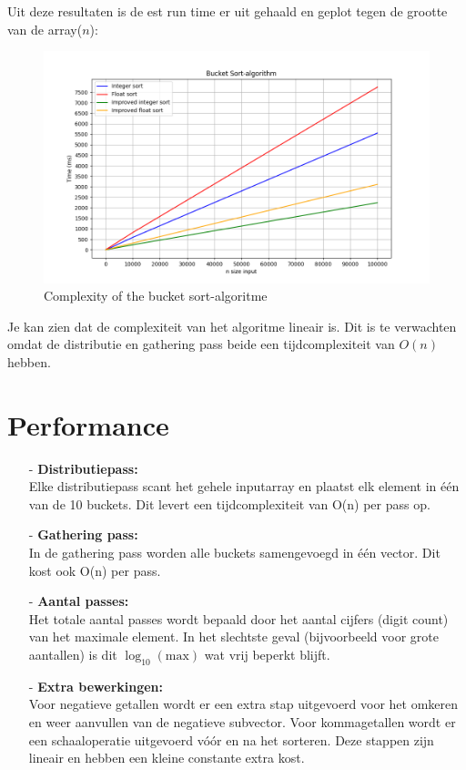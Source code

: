 \documentclass{article}
\begin{document}
\newpage
Uit deze resultaten is de est run time er uit gehaald en geplot tegen de grootte van de array($n$):

\begin{figure}[H]
    \includegraphics[width=1\textwidth]{images/bucket_sort.png}
    \caption{Complexity of the bucket sort-algoritme}
    \label{fig:complexity}
\end{figure}
Je kan zien dat de complexiteit van het algoritme lineair is. Dit is te verwachten omdat de distributie en gathering pass beide een tijdcomplexiteit van \(O(n)\) hebben.

\section{Performance}
\begin{itemize}
\item[-] \textbf{Distributiepass:} \\
Elke distributiepass scant het gehele inputarray en plaatst elk element in één van de 10 buckets. Dit levert een tijdcomplexiteit van O(n) per pass op.

\item[-] \textbf{Gathering pass:} \\
In de gathering pass worden alle buckets samengevoegd in één vector. Dit kost ook O(n) per pass.

\item[-] \textbf{Aantal passes:} \\
Het totale aantal passes wordt bepaald door het aantal cijfers (digit count) van het maximale element. In het slechtste geval (bijvoorbeeld voor grote aantallen) is dit $\log_{10}(\mathrm{max})$ wat vrij beperkt blijft.

\item[-] \textbf{Extra bewerkingen:} \\
Voor negatieve getallen wordt er een extra stap uitgevoerd voor het omkeren en weer aanvullen van de negatieve subvector.
Voor kommagetallen wordt er een schaaloperatie uitgevoerd vóór en na het sorteren. Deze stappen zijn lineair en hebben een kleine constante extra kost.
\end{itemize}
\end{document}
